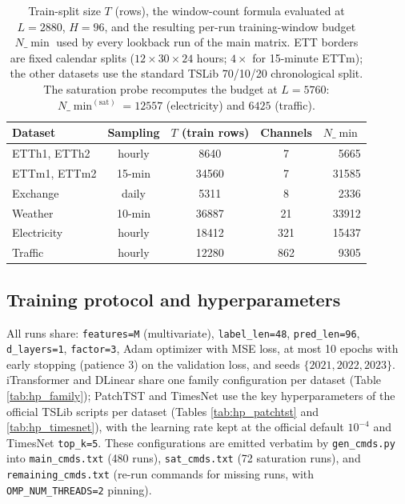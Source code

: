 \begin{table}[h]
\caption{Train-split size $T$ (rows), the window-count formula evaluated at $L{=}2880$, $H{=}96$, and the resulting per-run training-window budget $N\_{\min}$ used by every lookback run of the main matrix. ETT borders are fixed calendar splits ($12{\times}30{\times}24$ hours; $4{\times}$ for 15-minute ETTm); the other datasets use the standard TSLib 70/10/20 chronological split. The saturation probe recomputes the budget at $L{=}5760$: $N\_{\min}^{(\mathrm{sat})} = 12557$ (electricity) and $6425$ (traffic).}
\label{tab:nmin}
\centering\small
\begin{tabular}{lcccr}
\toprule
Dataset & Sampling & $T$ (train rows) & Channels & $N\_{\min}$ \\
\midrule
ETTh1, ETTh2 & hourly & 8640 & 7 & 5665 \\
ETTm1, ETTm2 & 15-min & 34560 & 7 & 31585 \\
Exchange & daily & 5311 & 8 & 2336 \\
Weather & 10-min & 36887 & 21 & 33912 \\
Electricity & hourly & 18412 & 321 & 15437 \\
Traffic & hourly & 12280 & 862 & 9305 \\
\bottomrule
\end{tabular}
\end{table}

\subsection{Training protocol and hyperparameters}

All runs share: \texttt{features=M} (multivariate), \texttt{label\_len=48}, \texttt{pred\_len=96}, \texttt{d\_layers=1}, \texttt{factor=3}, Adam optimizer with MSE loss, at most 10 epochs with early stopping (patience 3) on the validation loss, and seeds $\{2021, 2022, 2023\}$. iTransformer and DLinear share one family configuration per dataset (Table \ref{tab:hp_family}); PatchTST and TimesNet use the key hyperparameters of the official TSLib scripts per dataset (Tables \ref{tab:hp_patchtst} and \ref{tab:hp_timesnet}), with the learning rate kept at the official default $10^{-4}$ and TimesNet \texttt{top\_k=5}. These configurations are emitted verbatim by \texttt{gen\_cmds.py} into \texttt{main\_cmds.txt} (480 runs), \texttt{sat\_cmds.txt} (72 saturation runs), and \texttt{remaining\_cmds.txt} (re-run commands for missing runs, with \texttt{OMP\_NUM\_THREADS=2} pinning).

